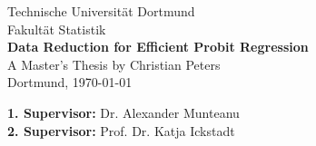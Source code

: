 \begin{titlepage}
    \begin{center}
        \LARGE{Technische Universit\"at Dortmund\\}
        \Large{Fakult\"at Statistik\\}
        \vspace{3cm}
        \LARGE{\textbf{Data Reduction for Efficient Probit Regression\\}}
        \vspace{3cm}
        \Large{A Master's Thesis by Christian Peters\\}
        \vspace{2cm}
        \Large{Dortmund, \today}
    \end{center}
    \vfill
    {\bfseries 1. Supervisor:} Dr. Alexander Munteanu\\
    {\bfseries 2. Supervisor:} Prof. Dr. Katja Ickstadt
    \thispagestyle{empty}
\end{titlepage}

